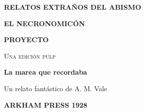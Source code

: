 \thispagestyle{empty}
\begin{center}
  \vspace*{8mm}
  {\color{Rust}\sffamily\bfseries\Large RELATOS EXTRAÑOS DEL ABISMO\par}
  \vspace{4mm}
  {\Huge\bfseries EL NECRONOMICÓN\par}
  {\Huge\bfseries PROYECTO\par}
  \vspace{3mm}
  {\Large\scshape Una edición pulp\par}
  \vspace{8mm}
  \par
  \vspace{6mm}
  {\Large\bfseries La marea que recordaba\par}
  \vfill
  {\large Un relato fantástico de A. M. Vale\par}
  \vspace{8mm}
  {\sffamily\bfseries ARKHAM PRESS \textbullet{} 1928\par}
\end{center}
\clearpage
